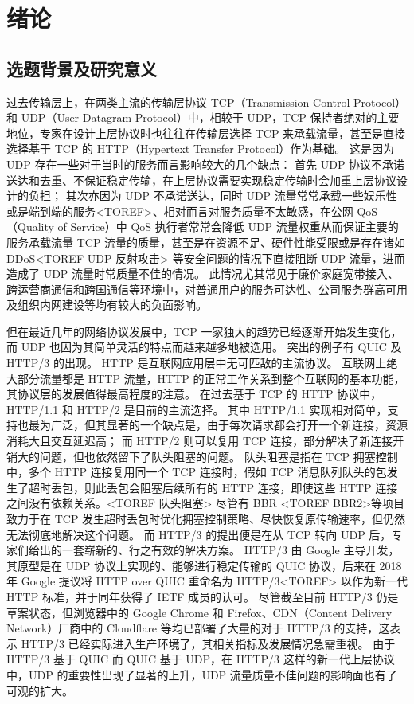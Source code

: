 

\chapter{绪论}

\section{选题背景及研究意义}

过去传输层上，在两类主流的传输层协议 TCP（Transmission Control Protocol）和 UDP（User Datagram Protocol）中，相较于 UDP，TCP 保持者绝对的主要地位，专家在设计上层协议时也往往在传输层选择 TCP 来承载流量，甚至是直接选择基于 TCP 的 HTTP（Hypertext Transfer Protocol）作为基础。
这是因为 UDP 存在一些对于当时的服务而言影响较大的几个缺点：
首先 UDP 协议不承诺送达和去重\cite{rfc768}、不保证稳定传输，在上层协议需要实现稳定传输时会加重上层协议设计的负担；
其次亦因为 UDP 不承诺送达，同时 UDP 流量常常承载一些娱乐性或是端到端的服务<TOREF>、相对而言对服务质量不太敏感，在公网 QoS（Quality of Service）中 QoS 执行者常常会降低 UDP 流量权重从而保证主要的服务承载流量 TCP 流量的质量，甚至是在资源不足、硬件性能受限或是存在诸如 DDoS<TOREF UDP 反射攻击> 等安全问题的情况下直接阻断 UDP 流量，进而造成了 UDP 流量时常质量不佳的情况。
此情况尤其常见于廉价家庭宽带接入、跨运营商通信和跨国通信等环境中，对普通用户的服务可达性、公司服务群高可用及组织内网建设等均有较大的负面影响。

但在最近几年的网络协议发展中，TCP 一家独大的趋势已经逐渐开始发生变化，而 UDP 也因为其简单灵活的特点而越来越多地被选用。
突出的例子有 QUIC 及 HTTP/3 的出现。
HTTP 是互联网应用层中无可匹敌的主流协议。
互联网上绝大部分流量都是 HTTP 流量，HTTP 的正常工作关系到整个互联网的基本功能，其协议层的发展值得最高程度的注意。
在过去基于 TCP 的 HTTP 协议中，HTTP/1.1 和 HTTP/2 是目前的主流选择。
其中 HTTP/1.1 实现相对简单，支持也最为广泛，但其显著的一个缺点是，由于每次请求都会打开一个新连接，资源消耗大且交互延迟高；
而 HTTP/2 则可以复用 TCP 连接，部分解决了新连接开销大的问题，但也依然留下了队头阻塞的问题。
队头阻塞是指在 TCP 拥塞控制中，多个 HTTP 连接复用同一个 TCP 连接时，假如 TCP 消息队列队头的包发生了超时丢包，则此丢包会阻塞后续所有的 HTTP 连接，即使这些 HTTP 连接之间没有依赖关系。<TOREF 队头阻塞>
尽管有 BBR\cite{45646} <TOREF BBR2>等项目致力于在 TCP 发生超时丢包时优化拥塞控制策略、尽快恢复原传输速率，但仍然无法彻底地解决这个问题。
而 HTTP/3 的提出便是在从 TCP 转向 UDP 后，专家们给出的一套崭新的、行之有效的解决方案。
HTTP/3 由 Google 主导开发，其原型是在 UDP 协议上实现的、能够进行稳定传输的 QUIC 协议，后来在 2018 年 Google 提议将 HTTP over QUIC 重命名为 HTTP/3<TOREF> 以作为新一代 HTTP 标准，并于同年获得了 IETF 成员的认可。
尽管截至目前 HTTP/3 仍是草案状态\cite{ietf-quic-http-34}，但浏览器中的 Google Chrome 和 Firefox、CDN（Content Delivery Network）厂商中的 Cloudflare 等均已部署了大量的对于 HTTP/3 的支持，这表示 HTTP/3 已经实际进入生产环境了，其相关指标及发展情况急需重视。
由于 HTTP/3 基于 QUIC 而 QUIC 基于 UDP，在 HTTP/3 这样的新一代上层协议中，UDP 的重要性出现了显著的上升，UDP 流量质量不佳问题的影响面也有了可观的扩大。

